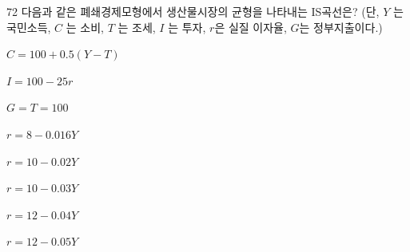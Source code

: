 \begin{question}{72}
다음과 같은 폐쇄경제모형에서 생산물시장의 균형을 나타내는 IS곡선은? (단, $Y$ 는 국민소득, $C$ 는 소비, $T$ 는 조세, $I$ 는 투자, $r$은 실질 이자율, $G$는 정부지출이다.)
\begin{framedtext}
$C=100+0.5(Y-T)$ \par
$I=100-25r$ \par
$G=T=100$
\end{framedtext}
\begin{choices}
  \item $r=8-0.016Y$
  \item $r=10-0.02Y$
  \item $r=10-0.03Y$
  \item $r=12-0.04Y$
  \item $r=12-0.05Y$
\end{choices}
\end{question}
